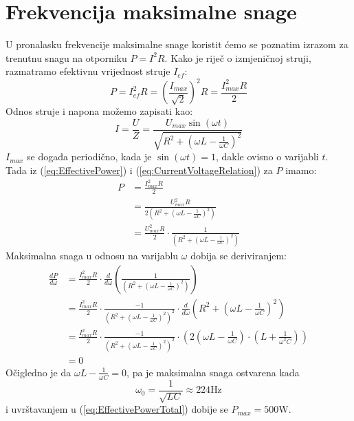 \documentclass{article}
\let\oldref\ref
\renewcommand{\ref}[1]{(\oldref{#1})}
\begin{document}
\section*{Frekvencija maksimalne snage}
U pronalasku frekvencije maksimalne snage koristit ćemo se poznatim izrazom za trenutnu snagu na otporniku $P = I^2R$. Kako je riječ o izmjeničnoj struji, razmatramo efektivnu vrijednost struje $I_{ef}$:
\begin{equation}
  \label{eq:EffectivePower}
  P = I_{ef}^2R = \left(\frac{I_{max}}{\sqrt{2}}\right)^2R = \frac{I_{max}^2R}{2}
\end{equation}
Odnos struje i napona možemo zapisati kao:
\begin{equation}
  \label{eq:CurrentVoltageRelation}
  I = \frac{U}{Z} = \frac{U_{max}\sin(\omega t)}{\sqrt{R^2 + (\omega L - \frac{1}{\omega C})^2}}
\end{equation}
$I_{max}$ se događa periodično, kada je $\sin(\omega t) = 1$, dakle ovisno o varijabli $t$.\\
Tada iz \ref{eq:EffectivePower} i \ref{eq:CurrentVoltageRelation} za $P$ imamo:
\begin{align}
  P & = \frac{I_{max}^2R}{2}                                                                                   \\
    & = \frac{U_{max}^2R}{2\left(R^2 + (\omega L - \frac{1}{\omega C})^2\right)}                  \\
  \label{eq:EffectivePowerTotal}
    & = \frac{U_{max}^2R}{2} \cdot \frac{1}{\left(R^2 + (\omega L - \frac{1}{\omega C})^2\right)}
\end{align}
Maksimalna snaga u odnosu na varijablu $\omega$ dobija se deriviranjem:
\begin{align}
  \frac{dP}{d\omega} & = \frac{I_{max}^2R}{2} \cdot \frac{d}{d\omega}\left(\frac{1}{\left(R^2 + (\omega L - \frac{1}{\omega C})^2\right)}\right)                                                          \\
                     & = \frac{I_{max}^2R}{2} \cdot \frac{-1}{\left(R^2 + (\omega L - \frac{1}{\omega C})^2\right)^2} \cdot \frac{d}{d\omega}\left(R^2 + \left(\omega L - \frac{1}{\omega C}\right)^2\right)         \\
                     & = \frac{I_{max}^2R}{2} \cdot \frac{-1}{\left(R^2 + (\omega L - \frac{1}{\omega C})^2\right)^2} \cdot \left(2\left(\omega L - \frac{1}{\omega C}\right)\cdot \left(L + \frac{1}{\omega^2C}\right) \right) \\
                     & = 0
\end{align}
Očigledno je da $\omega L - \frac{1}{\omega C} = 0$, pa je maksimalna snaga ostvarena kada
\begin{equation}
  \omega_0 = \frac{1}{\sqrt{LC}} \approx 224\text{Hz}
\end{equation}
i uvrštavanjem u \ref{eq:EffectivePowerTotal} dobije se $P_{max} = 500\text{W}$.
\newpage
\end{document}
